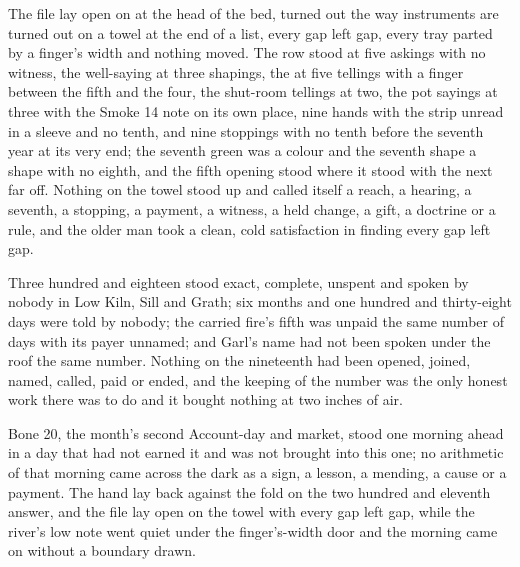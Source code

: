 The file lay open on  at the head of the bed, turned out the way instruments are turned out on a towel at the end of a list, every gap left gap, every tray parted by a finger's width and nothing moved. The row stood at five askings with no witness, the well-saying at three shapings, the  at five tellings with a finger between the fifth and the four, the shut-room tellings at two, the pot sayings at three with the Smoke 14 note on its own place, nine hands with the strip unread in a sleeve and no tenth, and nine stoppings with no tenth before the seventh year at its very end; the seventh green was a colour and the seventh shape a shape with no eighth, and the fifth opening stood where it stood with the next far off. Nothing on the towel stood up and called itself a reach, a hearing, a seventh, a stopping, a payment, a witness, a held change, a gift, a doctrine or a rule, and the older man took a clean, cold satisfaction in finding every gap left gap.

Three hundred and eighteen stood exact, complete, unspent and spoken by nobody in Low Kiln, Sill and Grath; six months and one hundred and thirty-eight days were told by nobody; the carried fire's fifth was unpaid the same number of days with its payer unnamed; and Garl's name had not been spoken under the roof the same number. Nothing on the nineteenth had been opened, joined, named, called, paid or ended, and the keeping of the number was the only honest work there was to do and it bought nothing at two inches of air.

Bone 20, the month's second Account-day and market, stood one morning ahead in a day that had not earned it and was not brought into this one; no arithmetic of that morning came across the dark as a sign, a lesson, a mending, a cause or a payment. The hand lay back against the fold on the two hundred and eleventh answer, and the file lay open on the towel with every gap left gap, while the river's low note went quiet under the finger's-width door and the morning came on without a boundary drawn.

